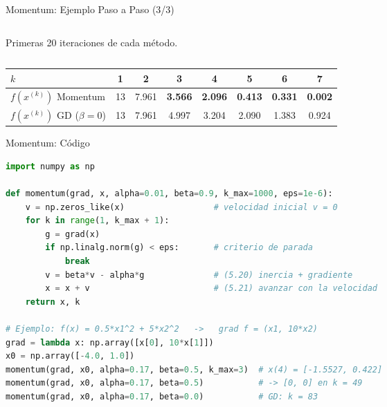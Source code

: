 \begin{frame}{Momentum: Ejemplo Paso a Paso (3/3)}
\begin{columns}[T]
\begin{column}{0.42\textwidth}
            {\tiny Primeras 20 iteraciones de cada método.\par}
        \end{column}
    \end{columns}

    \vspace{0.3em}
    \centering
    {\scriptsize
    \begin{tabular}{l c c c c c c c}
        \toprule
        $k$ & 1 & 2 & 3 & 4 & 5 & 6 & 7 \\
        \midrule
        $f(x^{(k)})$ Momentum & 13 & 7.961 & \textbf{3.566} & \textbf{2.096} & \textbf{0.413} & \textbf{0.331} & \textbf{0.002} \\
        $f(x^{(k)})$ GD ($\beta=0$) & 13 & 7.961 & 4.997 & 3.204 & 2.090 & 1.383 & 0.924 \\
        \bottomrule
    \end{tabular}\par}
\end{frame}

\begin{frame}[fragile]{Momentum: Código}
\begin{lstlisting}[language=Python]
import numpy as np

def momentum(grad, x, alpha=0.01, beta=0.9, k_max=1000, eps=1e-6):
    v = np.zeros_like(x)                  # velocidad inicial v = 0
    for k in range(1, k_max + 1):
        g = grad(x)
        if np.linalg.norm(g) < eps:       # criterio de parada
            break
        v = beta*v - alpha*g              # (5.20) inercia + gradiente
        x = x + v                         # (5.21) avanzar con la velocidad
    return x, k

# Ejemplo: f(x) = 0.5*x1^2 + 5*x2^2   ->   grad f = (x1, 10*x2)
grad = lambda x: np.array([x[0], 10*x[1]])
x0 = np.array([-4.0, 1.0])
momentum(grad, x0, alpha=0.17, beta=0.5, k_max=3)  # x(4) = [-1.5527, 0.422]
momentum(grad, x0, alpha=0.17, beta=0.5)           # -> [0, 0] en k = 49
momentum(grad, x0, alpha=0.17, beta=0.0)           # GD: k = 83
\end{lstlisting}
\end{frame}

